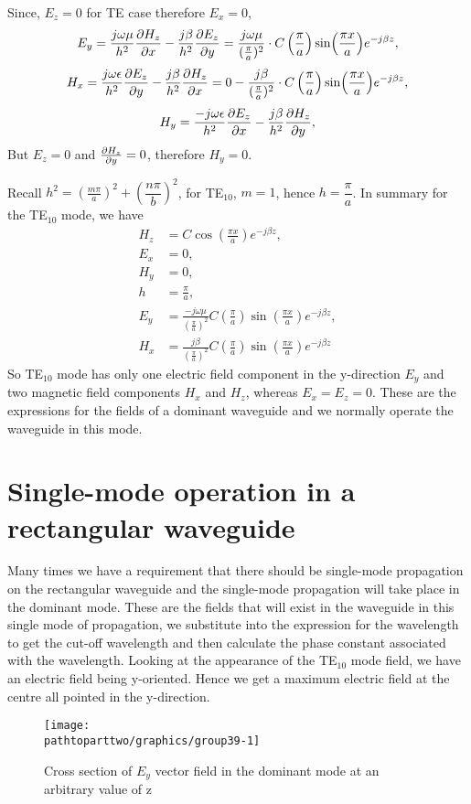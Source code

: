 Since, $E_z = 0$ for TE case therefore $E_x = 0$,
\begin{dmath*}
E_y = \frac{j\omega\mu}{h^2}\pdv{ H_z}{x} - \frac{j\beta}{h^2}\pdv{E_z}{y} = \frac{j\omega\mu}{(\frac{\pi}{a})^2} \cdot C\left(\frac{\pi}{a}\right)\sin(\frac{\pi x}{a})e^{-j\beta z},
\end{dmath*} 
\begin{dmath*}
H_x = \frac{j\omega\epsilon}{h^2}\pdv{E_z}{y} - \frac{j\beta}{h^2}\pdv{H_z}{x}= 0 - \frac{j\beta}{(\frac{\pi}{a})^2} \cdot C\left(\frac{\pi}{a}\right)\sin(\frac{\pi x}{a})e^{-j\beta z},
\end{dmath*}
\begin{dmath*}
H_y = \frac{-j\omega\epsilon}{h^2}\pdv{E_z}{x} -  \frac{j\beta}{h^2}\pdv{H_z}{y}, 
\end{dmath*}
But $E_z = 0$ and $\pdv{H_z}{y} = 0$, therefore $H_y = 0$. 

Recall $h^2 =\left(\frac{m\pi}{a}\right)^2 + \left(\dfrac{n\pi}{b}\right)^2$,  for TE$_{10}$, $m = 1$, hence $h = \dfrac{\pi}{a}$. In summary for the TE$_{10}$ mode, we have 
\begin{align}
H_z &= C\cos(\frac{\pi x}{a})e^{-j\beta z},\\
E_x &= 0,\\
H_y &= 0,\\
h &= \frac{\pi}{a},\\
E_y &=\frac{-j\omega\mu }{(\frac{\pi}{a})^2}C\left(\frac{\pi}{a}\right)\sin(\frac{\pi x}{a})e^{-j\beta z},\\ 
H_x &= \frac{j\beta}{(\frac{\pi}{a})^2}C\left(\frac{\pi}{a}\right)\sin(\frac{\pi x}{a})e^{-j\beta z} 
\end{align}
So TE$_{10}$ mode has only one electric field component in the y-direction $E_y$ and two magnetic field components $H_x$ and $H_z$, whereas $E_x = E_z = 0$. These are the expressions for the fields of a dominant waveguide and we normally operate the waveguide in this mode.

\section{Single-mode operation in a rectangular waveguide}
 Many times we have a requirement that there should be single-mode propagation on the rectangular waveguide and the single-mode propagation will take place in the dominant mode. These are the fields that will exist in the waveguide in this single mode of propagation, we substitute into the expression for the wavelength to get the cut-off wavelength and then calculate the phase constant associated with the wavelength. Looking at the appearance of the TE$_{10}$ mode field, we have an electric field being y-oriented. Hence we get a maximum electric field at the centre all pointed in the y-direction.
\begin{figure}[h]
\centering
\texttt{[image: \\pathtoparttwo/graphics/group39-1]}
\caption{Cross section of $E_y$ vector field in the dominant mode at an arbitrary value of z}
\label{fig:lec39-1}
\end{figure}

